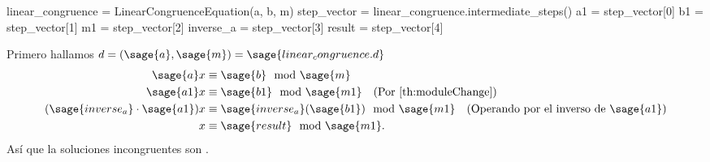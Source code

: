 \begin{sagesilent}
linear_congruence = LinearCongruenceEquation(a, b, m)
step_vector = linear_congruence.intermediate_steps()
a1 = step_vector[0]
b1 = step_vector[1]
m1 = step_vector[2]
inverse_a = step_vector[3]
result = step_vector[4]
\end{sagesilent}
Primero hallamos $d=({\sage{a}},{\sage{m}})=\sage{linear_congruence.d}$
\begin{align*}
	\sage{a}x &\equiv \sage{b} \mod{\sage{m}}\\
	\sage{a1}x &\equiv \sage{b1} \mod{\sage{m1}}\quad(\text{Por \ref{th:moduleChange}})\\
	(\sage{inverse_a}\cdot\sage{a1})x &\equiv \sage{inverse_a}(\sage{b1}) \mod{\sage{m1}}\quad(\text{Operando por el inverso de }\sage{a1})\\
	x &\equiv \sage{result} \mod{\sage{m1}}.
\end{align*}
Así que la soluciones incongruentes son .

